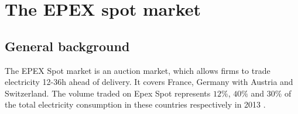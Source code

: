

%
%
%
%



\section{The EPEX spot market}
\label{epexall}
\subsection{General background}
\label{epexbackground}
The EPEX Spot market is an auction market, which allows firms to trade electricity 12-36h ahead of delivery. It covers France, Germany with Austria and Switzerland. The volume traded on Epex Spot represents $12\%$, $40\%$ and $30\%$ of the total electricity consumption in these countries respectively in 2013 \cite{epexwebsite1}.


